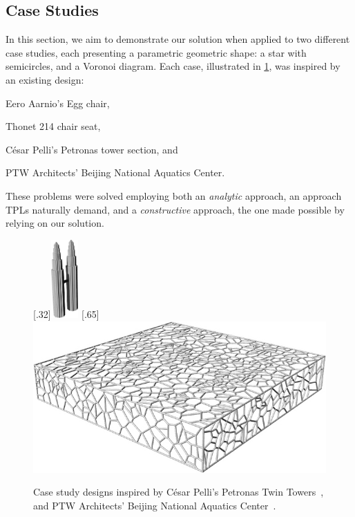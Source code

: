 \subsection{Case Studies}%
\label{sec:eval.studies}

In this section, we aim to demonstrate our solution when applied to two
different case studies, each presenting a parametric geometric shape: a star
with semicircles, and a Voronoi diagram.  Each case, illustrated in
\cref{fig:eval.studies.designs}, was inspired by an existing design:
\begin{enumerate*}[label= (\arabic*)]
  \item Eero Aarnio's Egg chair,
  \item Thonet 214 chair seat,
  \item César Pelli's Petronas tower section, and
  \item PTW Architects' Beijing National Aquatics Center.
\end{enumerate*}
These problems were solved employing both an \textit{analytic} approach, an
approach \acp{TPL} naturally demand, and a \textit{constructive} approach, the
one made possible by relying on our solution.

\begin{figure}[htb]
    [.32\linewidth]{\includegraphics[height=3cm]{fig/case-study-petronas}}
  \hfill
    [.65\linewidth]{%
      \includegraphics[width=\linewidth]{fig/case-study-water-cube}}
  \caption{\label{fig:eval.studies.designs}
    Case study designs inspired by César Pelli's Petronas Twin
    Towers~, and PTW Architects'
    Beijing National Aquatics
    Center~.}%
\end{figure}

